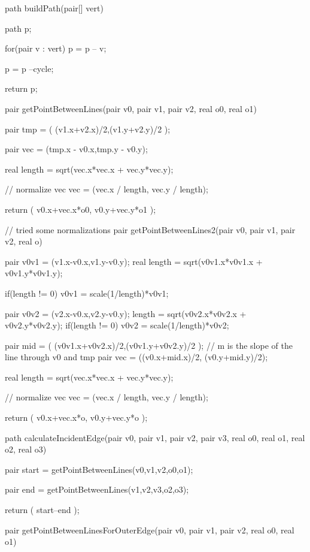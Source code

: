 \documentclass[a4paper]{article}
\begin{document}
\setlength{\parindent}{0pt} 


\begin{asydef}

path buildPath(pair[] vert){

path p;

for(pair v : vert)
	p = p -- v;

p = p --cycle;

return p;
}

pair getPointBetweenLines(pair v0, pair v1, pair v2, real o0, real o1){


	pair tmp = ( (v1.x+v2.x)/2,(v1.y+v2.y)/2 );

	pair vec = (tmp.x - v0.x,tmp.y - v0.y);
	
	real length = sqrt(vec.x*vec.x + vec.y*vec.y);
	
	// normalize vec
	vec = (vec.x / length, vec.y / length);
	
	return ( v0.x+vec.x*o0, v0.y+vec.y*o1 );	
	
}

// tried some normalizations
pair getPointBetweenLines2(pair v0, pair v1, pair v2, real o){

	pair v0v1 = (v1.x-v0.x,v1.y-v0.y);
	real length = sqrt(v0v1.x*v0v1.x + v0v1.y*v0v1.y);
	
	if(length != 0)
		v0v1 =  scale(1/length)*v0v1;
	
	pair v0v2 = (v2.x-v0.x,v2.y-v0.y);
	length = sqrt(v0v2.x*v0v2.x + v0v2.y*v0v2.y);
	if(length != 0)
		v0v2 = scale(1/length)*v0v2;


	pair mid = ( (v0v1.x+v0v2.x)/2,(v0v1.y+v0v2.y)/2 );
	// m is the slope of the line through v0 and tmp
	pair vec = ((v0.x+mid.x)/2, (v0.y+mid.y)/2);
	
	real length = sqrt(vec.x*vec.x + vec.y*vec.y);
	
	// normalize vec
	vec = (vec.x / length, vec.y / length);
	
	return ( v0.x+vec.x*o, v0.y+vec.y*o );	
}


path calculateIncidentEdge(pair v0, pair v1, pair v2, pair v3, real o0, real o1, 
							real o2, real o3){

	pair start = getPointBetweenLines(v0,v1,v2,o0,o1);

	pair end = getPointBetweenLines(v1,v2,v3,o2,o3);
	
	return ( start--end );
}




pair getPointBetweenLinesForOuterEdge(pair v0, pair v1, pair v2, real o0, real o1){

}
\end{asydef}
\end{document}
